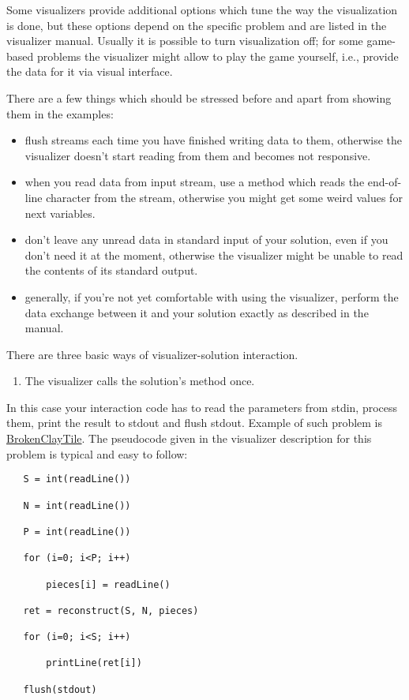 \documentclass[]{article}
\providecommand{\tightlist}{%
  \setlength{\itemsep}{0pt}\setlength{\parskip}{0pt}}
\begin{document}
Some visualizers provide additional options which tune the way the
visualization is done, but these options depend on the specific problem
and are listed in the visualizer manual. Usually it is possible to turn
visualization off; for some game-based problems the visualizer might
allow to play the game yourself, i.e., provide the data for it via
visual interface.

There are a few things which should be stressed before and apart from
showing them in the examples:

\begin{itemize}
\item
  flush streams each time you have finished writing data to them,
  otherwise the visualizer doesn't start reading from them and becomes
  not responsive.
\item
  when you read data from input stream, use a method which reads the
  end-of-line character from the stream, otherwise you might get some
  weird values for next variables.
\item
  don't leave any unread data in standard input of your solution, even
  if you don't need it at the moment, otherwise the visualizer might be
  unable to read the contents of its standard output.
\item
  generally, if you're not yet comfortable with using the visualizer,
  perform the data exchange between it and your solution exactly as
  described in the manual.
\end{itemize}

There are three basic ways of visualizer-solution interaction.

\begin{enumerate}
\def\labelenumi{\arabic{enumi}.}
\tightlist
\item
  The visualizer calls the solution's method once.
\end{enumerate}

In this case your interaction code has to read the parameters from
stdin, process them, print the result to stdout and flush stdout.
Example of such problem is
\href{http://www.topcoder.com/longcontest/?module=ViewProblemStatement\&rd=14209\&pm=10756}{BrokenClayTile}.
The pseudocode given in the visualizer description for this problem is
typical and easy to follow:

\begin{verbatim}
   S = int(readLine())

   N = int(readLine())

   P = int(readLine())

   for (i=0; i<P; i++)

       pieces[i] = readLine()

   ret = reconstruct(S, N, pieces)

   for (i=0; i<S; i++)

       printLine(ret[i])

   flush(stdout)
\end{verbatim}
\end{document}
